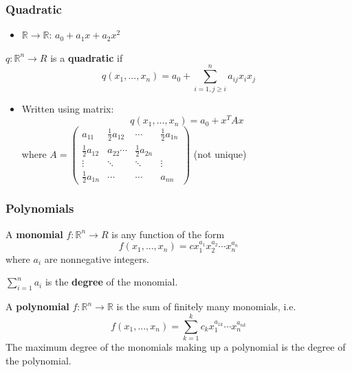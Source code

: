 \documentclass[compress]{beamer}
\def\R{\mathbb{R}}
\renewcommand{\to}{{\rightarrow}}
\begin{document}
\begin{frame}
  \frametitle{Quadratic}
  \begin{itemize}
  \item $\R \to \R$:  $a_0 + a_1 x + a_2 x^2$
  \end{itemize}
  \begin{definition}
    $q:\R^n \to R$ is a \textbf{quadratic} if 
    \[ q(x_1, ..., x_n) = a_0 + \sum_{i=1, j \geq i}^n a_{ij} x_i x_j \]
  \end{definition}
  \begin{itemize}
  \item Written using matrix:
    \[ q(x_1,..., x_n) = a_0 + x^T A x \]
    where $A = \begin{pmatrix} a_{11} & \frac{1}{2} a_{12} & \cdots &
      \frac{1}{2} a_{1n} \\
      \frac{1}{2} a_{12} & a_{22} \cdots & \frac{1}{2} a_{2n} \\
      \vdots & \ddots & \ddots & \vdots \\
      \frac{1}{2} a_{1n} & \cdots & \cdots & a_{nn}
    \end{pmatrix}$ (not unique)
  \end{itemize}
\end{frame}

\begin{frame}
  \frametitle{Polynomials}
  \begin{definition}
    A \textbf{monomial} $f:\R^n \to R$ is any function of the form
    \[ f(x_1, ..., x_n) = c x_1^{a_1} x_2^{a_2} \cdots x_n^{a_n} \]
    where $a_i$ are nonnegative integers. 
    
    $\sum_{i=1}^n a_i$ is the \textbf{degree} of the monomial. 

    A \textbf{polynomial} $f:\R^n \to \R$ is the sum of finitely many
    monomials, i.e.
    \[ f(x_1, ..., x_n) = \sum_{k=1}^k c_k x_1^{a_{1k}}\cdots
    x_n^{a_{nk}} \]
    The maximum degree of the monomials making up a polynomial is the
    degree of the polynomial.
  \end{definition}
\end{frame}
\end{document}
